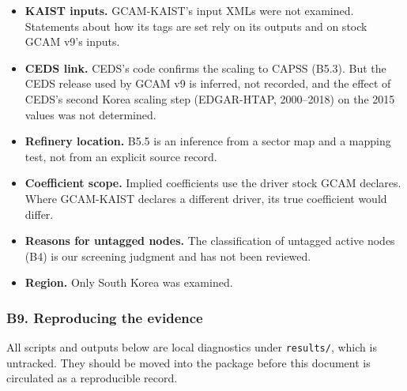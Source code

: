 \begin{itemize}
\tightlist
\item
  \textbf{KAIST
  inputs.}
  GCAM-KAIST's
  input
  XMLs
  were not
  examined.
  Statements
  about
  how its
  tags are
  set rely
  on its
  outputs
  and on
  stock
  GCAM
  v9's
  inputs.
\item
  \textbf{CEDS link.} CEDS's code confirms the scaling to CAPSS (B5.3). But
  the CEDS release used by GCAM v9 is inferred, not recorded, and the effect of
  CEDS's second Korea scaling step (EDGAR-HTAP, 2000--2018) on the 2015 values
  was not determined.
\item
  \textbf{Refinery
  location.}
  B5.5 is
  an
  inference
  from a
  sector
  map and
  a
  mapping
  test,
  not from
  an
  explicit
  source
  record.
\item
  \textbf{Coefficient
  scope.}
  Implied
  coefficients
  use the
  driver
  stock
  GCAM
  declares.
  Where
  GCAM-KAIST
  declares
  a
  different
  driver,
  its true
  coefficient
  would
  differ.
\item
  \textbf{Reasons
  for
  untagged
  nodes.}
  The
  classification
  of
  untagged
  active
  nodes
  (B4) is
  our
  screening
  judgment
  and has
  not been
  reviewed.
\item
  \textbf{Region.}
  Only
  South
  Korea
  was
  examined.
\end{itemize}

\hypertarget{b9.-reproducing-the-evidence}{%
\subsubsection{B9.
Reproducing
the
evidence}\label{b9.-reproducing-the-evidence}}

All
scripts
and
outputs
below are
local
diagnostics
under
\texttt{results/\allowbreak{}},
which is
untracked.
They
should be
moved into
the
package
before
this
document
is
circulated
as a
reproducible
record.

